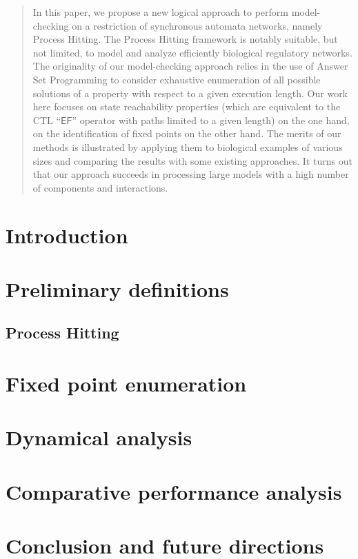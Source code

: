 \documentclass{tlp}
\begin{document}
\label{firstpage}
%
\begin{abstract}
In this paper, we propose a new logical approach to perform model-checking on a restriction of synchronous automata networks, namely Process Hitting. The Process Hitting framework is notably suitable, but not limited, to model and analyze efficiently biological regulatory networks. 
The originality of our model-checking approach relies in the use of Answer Set Programming to consider exhaustive enumeration of all possible solutions of a property with respect to a given execution length.  Our work here focuses on state reachability properties (which are equivalent to the CTL “$\mathsf{EF}$” operator with paths limited to a given length) on the one hand, on the identification of fixed points on the other hand.
The merits of our methods is illustrated by applying them to
biological examples of various sizes
and comparing the results with some existing approaches.
It turns out that our approach succeeds in processing large models
with a high number of components and interactions.

\end{abstract}

\section{Introduction}


\section{Preliminary definitions}
\label{defs}
%
\subsection{Process Hitting}


\section{Fixed point enumeration}
\label{fixpoint}


\section{Dynamical analysis}
\label{dynamics}


\section{Comparative performance analysis}
\label{comparison}



\section{Conclusion and future directions}
\label{ccl}







\clearpage
\appendix


\end{document}
